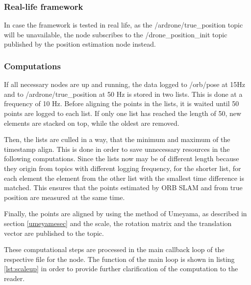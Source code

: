 	\subsubsection{Real-life framework}
	
	In case the framework is tested in real life, as the /ardrone/true\_position topic will be unavailable, 
	the node subscribes to the /drone\_position\_init topic published by the position estimation node instead. 
	
	\subsubsection{Computations}
	
	If all necessary nodes are up and running, the data  logged to /orb/pose at 15Hz and to /ardrone/true\_position at 50 Hz is stored in two lists. This is done at 
	a frequency of 10 Hz. Before aligning the points in the lists, it is waited until 50 points are logged to each list. If only one list has reached 
	the length of 50, new elements are stacked on top, while the oldest are removed. 
	
	Then, the lists are culled in a way, that the minimum and maximum of the timestamp align. This is done in order to save unnecessary resources in the following computations. Since the lists now may be of different length because they origin from topics with different logging frequency, 
	for the shorter list, for each element the element from the other list with the smallest time difference is matched. This ensures that the points 
	estimated by ORB SLAM and from true position are measured at the same time. 
	
	Finally, the points are aligned by using the method of Umeyama, as described in section \ref{umeyamesec} and the scale, the rotation matrix and the translation
    vector are published to the topic. 
	
	These computational steps are processed in the main callback loop of the respective file for the node. The function of the main loop is shown in listing \ref{lst:scaleup} in order 
	to provide further clarification of the computation to the reader. 
	
